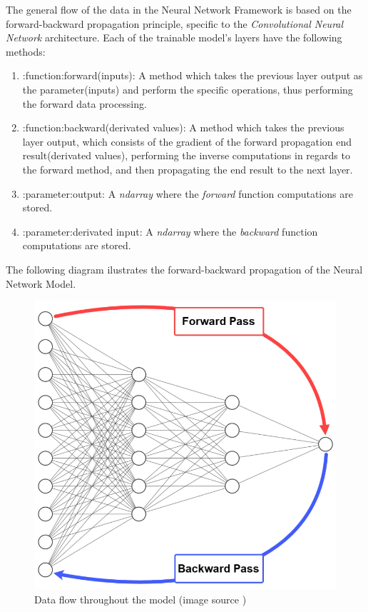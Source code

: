 The general flow of the data in the Neural Network Framework is based on the forward-backward propagation principle,
specific to the \textit{Convolutional Neural Network} architecture.
Each of the trainable model's layers have the following methods:

\begin{enumerate}
	\item :function:forward(inputs): A method which takes the previous layer output as the parameter(inputs)
	and perform the specific operations, thus performing the forward data processing.
	\item :function:backward(derivated values): A method which takes the previous layer output, which consists
	of the gradient of the forward propagation end result(derivated values), performing the inverse
	computations in regards to the forward method, and then propagating the end result to the next layer.
	\item :parameter:output: A \textit{ndarray} where the \textit{forward} function computations are stored.
	\item :parameter:derivated input: A \textit{ndarray} where the \textit{backward} function computations are stored.

\end{enumerate}

The following diagram ilustrates the forward-backward propagation of the Neural Network Model.

\begin{figure}[H]
	\centering
	\includegraphics[width = 5.5in]{images/fwbw.png}
	\caption{Data flow throughout the model (image source \cite{fwbw})}
\label{data_flow}
\end{figure}


